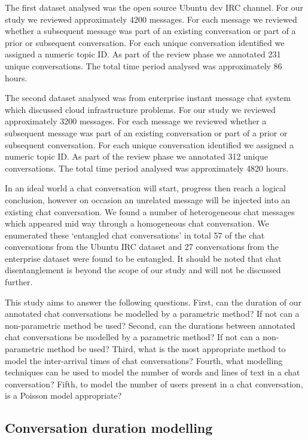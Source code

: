 \documentclass[conference]{IEEEtran}
\begin{document}
The first dataset analysed was the open source Ubuntu dev IRC channel. \cite{irclogs} For our study we reviewed approximately 4200 messages. For each message we reviewed whether a subsequent message was part of an existing conversation or part of a prior or subsequent conversation. For each unique conversation identified we assigned a numeric topic ID. As part of the review phase we annotated 231 unique conversations. The total time period analysed was approximately 86 hours. 

The second dataset analysed was from enterprise instant message chat system which discussed cloud infrastructure problems. For our study we reviewed approximately 3200 messages. For each message we reviewed whether a subsequent message was part of an existing conversation or part of a prior or subsequent conversation. For each unique conversation identified we assigned a numeric topic ID. As part of the review phase we annotated 312 unique conversations. The total time period analysed was approximately 4820 hours. 

In an ideal world a chat conversation will start, progress then reach a logical conclusion, however on occasion an unrelated message will be injected into an existing chat conversation. We found a number of heterogeneous chat messages which appeared mid way through a homogeneous chat conversation. We enumerated these `entangled chat conversations' \cite{elsner2010disentangling} in total 57 of the chat conversations from the Ubuntu IRC dataset and 27 conversations from the enterprise dataset were found to be entangled. It should be noted that chat disentanglement is beyond the scope of our study and will not be discussed further.

This study aims to answer the following questions. First, can the duration of our annotated chat conversations be modelled by a parametric method? If not can a non-parametric method be used? Second, can the durations between annotated chat conversations be modelled by a parametric method? If not can a non-parametric method be used? Third, what is the most appropriate method to model the inter-arrival times of chat conversations? Fourth, what modelling techniques can be used to model the number of words and lines of text in a chat conversation? Fifth, to model the number of users present in a chat conversation, is a Poisson model appropriate?

\subsection{Conversation duration modelling}
\end{document}
